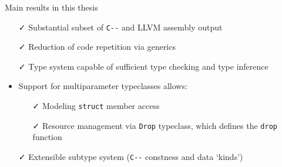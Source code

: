 \documentclass[aspectratio=169]{beamer}
\newcommand{\li}[1]{\lstinline{#1}}
\def\cmm{\texttt{C-\relax-}}
\begin{document}

\begin{frame}{Main results in this thesis}
  \begin{itemize}
  \item[\color{green!80!black}\faCheck] Substantial subset of \cmm{} and LLVM assembly output
  \item[\color{green!80!black}\faCheck] Reduction of code repetition via generics
  \item[\color{green!80!black}\faCheck] Type system capable of sufficient type checking and type inference
  \item Support for multiparameter typeclasses allows:
    \begin{itemize}
      \item[\color{green!80!black}\faCheck] Modeling \li{struct} member access
      \item[\color{green!80!black}\faCheck] Resource management via \li{Drop} typeclass, which defines the \li{drop} function
    \end{itemize}
  \item[\color{green!80!black}\faCheck] Extensible subtype system (\cmm{} constness and data `kinds')
  \end{itemize}
\end{frame}


%
%
\end{document}
